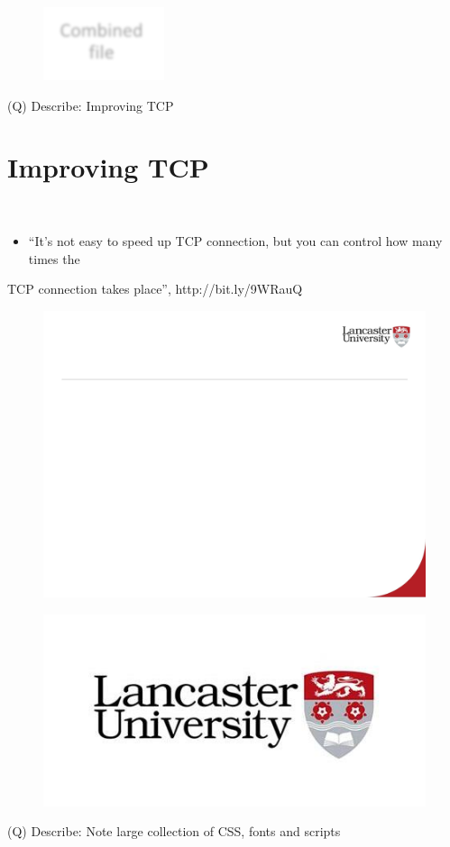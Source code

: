 \documentclass[12pt]{article}
\begin{document}
\begin{figure}[H]
\includegraphics[width=0.5\linewidth]{page49-image-14.png}
\end{figure}
\clearpage
(Q)
Describe: Improving TCP
\clearpage
\section{Improving TCP}
\\
\begin{itemize}
  \item “It’s not easy to speed up TCP connection, but you can control how many times the 
\end{itemize}
TCP connection takes place”, http://bit.ly/9WRauQ\\
\begin{figure}[H]
\includegraphics[width=0.5\linewidth]{page50-image-1.png}
\end{figure}
\begin{figure}[H]
\includegraphics[width=0.5\linewidth]{page50-image-2.png}
\end{figure}
\clearpage
(Q)
Describe: Note large collection of CSS, fonts and scripts 
\clearpage
\end{document}
